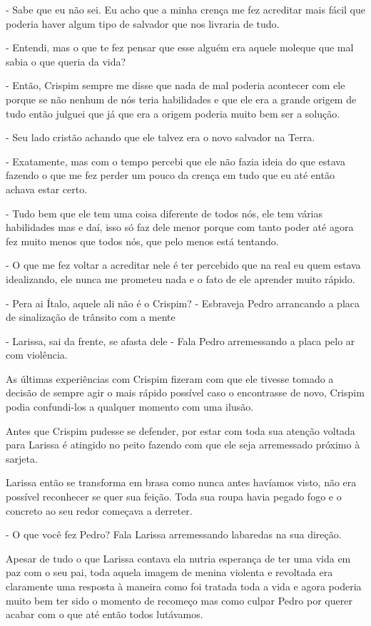 - Sabe que eu não sei. Eu acho que a minha crença me fez acreditar mais fácil que poderia haver algum tipo de salvador que nos livraria de tudo.

- Entendi, mas o que te fez pensar que esse alguém era aquele moleque que mal sabia o que queria da vida?

- Então, Crispim sempre me disse que nada de mal poderia acontecer com ele porque se não nenhum de nós teria habilidades e que ele era a grande origem de tudo então julguei que já que era a origem poderia muito bem ser a solução.

- Seu lado cristão achando que ele talvez era o novo salvador na Terra.

- Exatamente, mas com o tempo percebi que ele não fazia ideia do que estava fazendo o que me fez perder um pouco da crença em tudo que eu até então achava estar certo.

- Tudo bem que ele tem uma coisa diferente de todos nós, ele tem várias habilidades mas e daí, isso só faz dele menor porque com tanto poder até agora fez muito menos que todos nós, que pelo menos está tentando.

- O que me fez voltar a acreditar nele é ter percebido que na real eu quem estava idealizando, ele nunca me prometeu nada e o fato de ele aprender muito rápido.

- Pera ai Ítalo, aquele ali não é o Crispim? - Esbraveja Pedro arrancando a placa de sinalização de trânsito com a mente

- Larissa, sai da frente, se afasta dele - Fala Pedro arremessando a placa pelo ar com violência.

As últimas experiências com Crispim fizeram com que ele tivesse tomado a decisão de sempre agir o mais rápido possível caso o encontrasse de novo, Crispim podia confundi-los a qualquer momento com uma ilusão.

Antes que Crispim pudesse se defender, por estar com toda sua atenção voltada para Larissa é atingido no peito fazendo com que ele seja arremessado próximo à sarjeta.

Larissa então se transforma em brasa como nunca antes havíamos visto, não era possível reconhecer se quer sua feição. Toda sua roupa havia pegado fogo e o concreto ao seu redor começava a derreter.

- O que você fez Pedro? Fala Larissa arremessando labaredas na sua direção.

Apesar de tudo o que Larissa contava ela nutria esperança de ter uma vida em paz com o seu pai, toda aquela imagem de menina violenta e revoltada era claramente uma resposta à maneira como foi tratada toda a vida e agora poderia muito bem ter sido o momento de recomeço mas como culpar Pedro por querer acabar com o que até então todos lutávamos.


